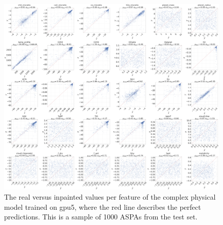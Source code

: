 \begin{figure} [!htb]
    \centering
    \includegraphics[width=\textwidth,keepaspectratio]{figuren/small gpu5.png}
    \caption{The real versus inpainted values per feature of the complex physical model trained on gpu5, where the red line describes the perfect predictions. This is a sample of 1000 ASPAs from the test set.}
    \label{fig:gan_results_small_gpu5}
\end{figure}